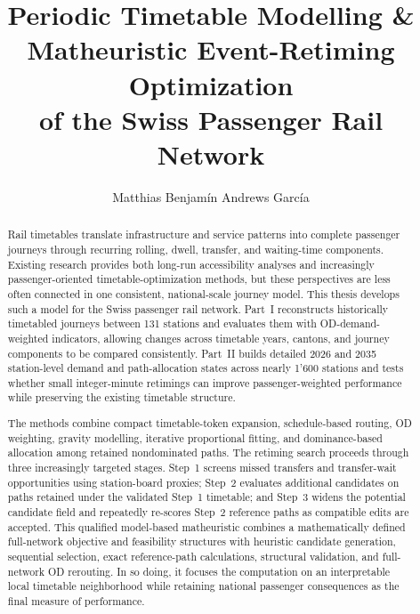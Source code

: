 \documentclass[preprint,12pt]{elsarticle}
\begin{document}
\clearpage
\thispagestyle{empty}
\null
\clearpage

\begin{frontmatter}

\renewcommand{\thesubfigure}{\arabic{subfigure}}
\makeatletter
\renewcommand{\p@subfigure}{\thefigure.}
\makeatother

\title{Periodic Timetable Modelling \& \\ Matheuristic Event-Retiming Optimization\\
of the Swiss Passenger Rail Network}

\author{Matthias Benjamín Andrews García}
\address{
IVT,
Swiss Federal Institute of Technology\\
Stefano-Franscini-Platz 5, 8093 Zurich, Switzerland\\
E-mail: mandrews@student.ethz.ch, Student number: 19-757-996\\
June 2026}
\begin{abstract}
Rail timetables translate infrastructure and service patterns into complete passenger journeys through recurring rolling, dwell, transfer, and waiting-time components. Existing research provides both long-run accessibility analyses and increasingly passenger-oriented timetable-optimization methods, but these perspectives are less often connected in one consistent, national-scale journey model. This thesis develops such a model for the Swiss passenger rail network. Part~I reconstructs historically timetabled journeys between 131 stations and evaluates them with OD-demand-weighted indicators, allowing changes across timetable years, cantons, and journey components to be compared consistently. Part~II builds detailed 2026 and 2035 station-level demand and path-allocation states across nearly 1'600 stations and tests whether small integer-minute retimings can improve passenger-weighted performance while preserving the existing timetable structure.

The methods combine compact timetable-token expansion, schedule-based routing, OD weighting, gravity modelling, iterative proportional fitting, and dominance-based allocation among retained nondominated paths. The retiming search proceeds through three increasingly targeted stages. Step~1 screens missed transfers and transfer-wait opportunities using station-board proxies; Step~2 evaluates additional candidates on paths retained under the validated Step~1 timetable; and Step~3 widens the potential candidate field and repeatedly re-scores Step~2 reference paths as compatible edits are accepted. This qualified model-based matheuristic combines a mathematically defined full-network objective and feasibility structures with heuristic candidate generation, sequential selection, exact reference-path calculations, structural validation, and full-network OD rerouting. In so doing, it focuses the computation on an interpretable local timetable neighborhood while retaining national passenger consequences as the final measure of performance.


\end{abstract}
\end{frontmatter}
\end{document}
